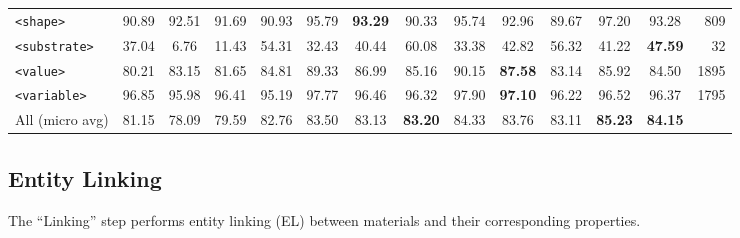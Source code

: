 \documentclass[]{interact}
\theoremstyle{plain}%
\theoremstyle{definition}
\theoremstyle{remark}
\begin{document}
\begin{table}[ht]
{{\begin{tabular}{l ccc ccc ccc ccc r}
            \texttt{<shape>}       & 90.89                            & 92.51                                     & 91.69                                              & 90.93      & 95.79      & \textbf{93.29} & 90.33          & 95.74      & 92.96          & 89.67      & 97.20          & 93.28          & 809  \\
            \texttt{<substrate>}   & 37.04                            & 6.76                                      & 11.43                                              & 54.31      & 32.43      & 40.44          & 60.08          & 33.38      & 42.82          & 56.32      & 41.22          & \textbf{47.59} & 32   \\
            \texttt{<value>}       & 80.21                            & 83.15                                     & 81.65                                              & 84.81      & 89.33      & 86.99          & 85.16          & 90.15      & \textbf{87.58} & 83.14      & 85.92          & 84.50          & 1895 \\
            \texttt{<variable>}    & 96.85                            & 95.98                                     & 96.41                                              & 95.19      & 97.77      & 96.46          & 96.32          & 97.90      & \textbf{97.10} & 96.22      & 96.52          & 96.37          & 1795 \\
            \midrule
            All (micro avg)        & 81.15                            & 78.09                                     & 79.59                                              & 82.76      & 83.50      & 83.13          & \textbf{83.20} & 84.33      & 83.76          & 83.11      & \textbf{85.23} & \textbf{84.15} &      \\
            \bottomrule
        \end{tabular}
    }
    }
    \label{tab:evaluation-10fold-material-parser}
\end{table}

\subsection{Entity Linking}
\label{subsubsec:linking}

The ``Linking'' step performs entity linking (EL) between materials and their corresponding properties.
\end{document}

